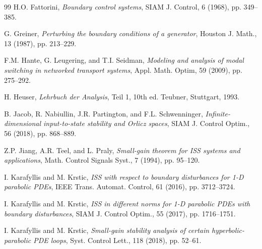 \documentclass[onecolumn]{autart}
\numberwithin{equation}{section}
\begin{document}
\begin{thebibliography}{99}
		H.O. Fattorini, \emph{Boundary control systems}, SIAM J. Control, 6 (1968), pp. 349--385.
		
		G. Greiner, \emph{Perturbing the boundary conditions of a generator}, Houston J. Math., 13 (1987), pp. 213--229.
		
		F.M. Hante, G. Leugering, and T.I. Seidman, \emph{Modeling and analysis of modal switching in networked transport systems}, Appl. Math. Optim, 59 (2009), pp. 275--292.
		
		H. Heuser, \emph{Lehrbuch der Analysis}, Teil 1, 10th ed. Teubner, Stuttgart, 1993.

		
		B. Jacob, R. Nabiullin, J.R. Partington, and F.L. Schwenninger, \emph{Infinite-dimensional input-to-state stability and Orlicz spaces}, SIAM J. Control Optim., 56 (2018), pp. 868--889.

		
		
		Z.P. Jiang, A.R. Teel, and L. Praly, \emph{Small-gain theorem for ISS systems and applications}, Math. Control Signals Syst., 7 (1994), pp. 95--120.
		
		I. Karafyllis and M. Krstic, \emph{ISS with respect to boundary disturbances for 1-D parabolic PDEs}, IEEE Trans. Automat. Control, 61 (2016), pp. 3712--3724.
		
		I. Karafyllis and M. Krstic, \emph{ISS in different norms for 1-D parabolic PDEs with boundary disturbances}, SIAM J. Control Optim., 55 (2017), pp. 1716--1751.
		
		I. Karafyllis and M. Krstic, \emph{Small-gain stability analysis of certain hyperbolic-parabolic PDE loops}, Syst. Control Lett., 118 (2018), pp. 52--61.
		

\end{thebibliography}
\end{document}
